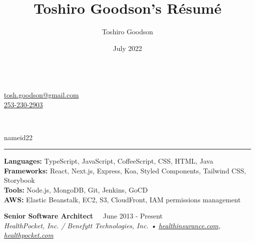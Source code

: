 \documentclass{resume}
\title{Toshiro Goodson's Résumé}
\author{Toshiro Goodson}
\date{July 2022}
\begin{document}
\color{content}
{\Large{}}\\
\href{mailto:tosh.goodson@gmail.com}{\color{content}tosh.goodson@gmail.com}\\
\href{tel:+12532302903}{\color{content}253-230-2903}
\hfill{\textcolor{white}{•}} %
\hfill{
	\textcolor{white}{github.com/toshgoodson • linkedin.com/in/toshgoodson}
	\begin{ocg}[viewocg=always,printocg=never,exportocg=never]{name}{id2}{2}
		\href{https://github.com/toshgoodson}{}
		\hspace{2pt}
		\href{https://www.linkedin.com/in/toshgoodson/}{}
	\end{ocg}
}

\nointerlineskip
\rule{\textwidth}{1pt}

\nointerlineskip
\colorbox{headerbg1}{\hspace{\linewidth}\hspace{-2\fboxsep}}

\textbf{Languages:} TypeScript, JavaScript, CoffeeScript, CSS, HTML, Java\\
\textbf{Frameworks:} React, Next.js, Express, Koa, Styled Components, Tailwind CSS, Storybook\\
\textbf{Tools:} Node.js, MongoDB, Git, Jenkins, GoCD\\
\textbf{AWS:} Elastic Beanstalk, EC2, S3, CloudFront, IAM permissions management

\bigskip

\colorbox{headerbg2}{\hspace{\linewidth}\hspace{-2\fboxsep}}

\textbf{Senior Software Architect}
\hfill{\textcolor{white}{•} June 2013 - Present}\\
\textit{HealthPocket, Inc. / Benefytt Technologies, Inc. • \href{https://www.healthinsurance.com}{healthinsurance.com}, \href{https://www.healthpocket.com}{healthpocket.com}}
\end{document}

